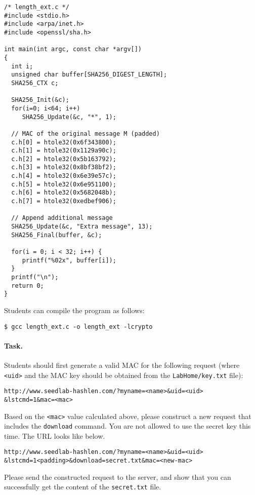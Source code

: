 \begin{lstlisting}[escapechar=|]
/* length_ext.c */
#include <stdio.h>
#include <arpa/inet.h>
#include <openssl/sha.h>

int main(int argc, const char *argv[])
{
  int i;
  unsigned char buffer[SHA256_DIGEST_LENGTH];
  SHA256_CTX c;
  
  SHA256_Init(&c);
  for(i=0; i<64; i++)
     SHA256_Update(&c, "*", 1);
  
  // MAC of the original message M (padded)
  c.h[0] = htole32(0x6f343800);
  c.h[1] = htole32(0x1129a90c);
  c.h[2] = htole32(0x5b163792);
  c.h[3] = htole32(0x8bf38bf2);
  c.h[4] = htole32(0x6e39e57c);	
  c.h[5] = htole32(0x6e951100);
  c.h[6] = htole32(0x5682048b);	
  c.h[7] = htole32(0xedbef906);
  
  // Append additional message
  SHA256_Update(&c, "Extra message", 13); 
  SHA256_Final(buffer, &c);

  for(i = 0; i < 32; i++) {
     printf("%02x", buffer[i]);
  }	 
  printf("\n");
  return 0;
}
\end{lstlisting}

Students can compile the program as follows:

\begin{lstlisting}
$ gcc length_ext.c -o length_ext -lcrypto
\end{lstlisting}

\paragraph{Task.} Students should first generate a valid MAC for the
following request (where \texttt{<uid>} and the MAC key should be 
obtained from the \texttt{LabHome/key.txt} file): 

\begin{lstlisting}
http://www.seedlab-hashlen.com/?myname=<name>&uid=<uid>
&lstcmd=1&mac=<mac>
\end{lstlisting}

Based on the \texttt{<mac>} value calculated above, please construct a new request that
includes the \texttt{download} command. You are not allowed to use the secret key this time.
The URL looks like below.

\begin{lstlisting}
http://www.seedlab-hashlen.com/?myname=<name>&uid=<uid>
&lstcmd=1<padding>&download=secret.txt&mac=<new-mac>
\end{lstlisting}
 
Please send the constructed request to the server, and show that you can
successfully get the content of the \texttt{secret.txt} file.  



